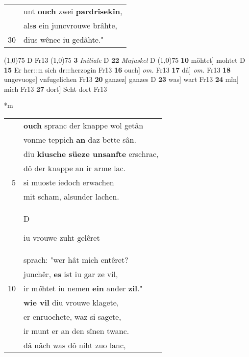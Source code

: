 \documentclass[8pt,a4paper,notitlepage]{article}
\begin{document}
\begin{table}[ht]
\begin{minipage}[t]{0.5\linewidth}
\begin{tabular}{rl}
 & unt \textbf{ouch} zwei \textbf{pardrîsekîn},\\ 
 & als\textbf{s} ein juncvrouwe brâhte,\\ 
30 & dius wênec iu gedâhte."\\ 
\end{tabular}
\scriptsize
\line(1,0){75} \newline
D Fr13 \newline
\line(1,0){75} \newline
\textbf{3} \textit{Initiale} D  \textbf{22} \textit{Majuskel} D  \newline
\line(1,0){75} \newline
\textbf{10} möhtet] mohtet D \textbf{15} Er her:::n sich dr:::herzogin Fr13 \textbf{16} ouch] \textit{om.} Fr13 \textbf{17} dâ] \textit{om.} Fr13 \textbf{18} ungevuoge] vnfugelichen Fr13 \textbf{20} ganzez] ganzes D \textbf{23} was] wart Fr13 \textbf{24} mîn] mich Fr13 \textbf{27} dort] Seht dort Fr13 \newline
\end{minipage}
\hspace{0.5cm}
\begin{minipage}[t]{0.5\linewidth}
\small
\begin{center}*m
\end{center}
\begin{tabular}{rl}
 & \textbf{ouch} spranc der knappe wol getân\\ 
 & vonme teppich \textbf{an} daz bette sân.\\ 
 & diu \textbf{kiusche süeze unsanfte} erschrac,\\ 
 & dô der knappe an ir arme lac.\\ 
5 & si muoste iedoch erwachen\\ 
 & mit scham, alsunder lachen.\\ 
 & \begin{large}D\end{large}iu vrouwe zuht gelêret\\ 
 & sprach: "wer hât mich entêret?\\ 
 & junchêr, \textbf{es} ist iu gar ze vil,\\ 
10 & ir m\textit{ö}htet iu nemen \textbf{ein} ander \textbf{zil}."\\ 
 & \textbf{wie vil} diu vrouwe klagete,\\ 
 & er enruochete, waz si sagete,\\ 
 & ir munt er an den sînen twanc.\\ 
 & dâ nâch was dô niht zuo lanc,\\ 

\end{tabular}
\end{minipage}
\end{table}
\end{document}
